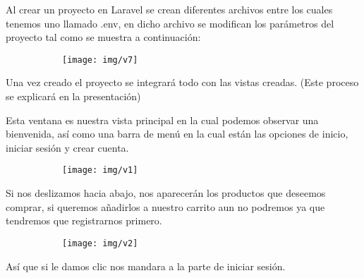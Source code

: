 \documentclass[letterpaper,12pt]{article}
\begin{document}
	
	Al crear un proyecto en Laravel se crean diferentes archivos entre los cuales tenemos uno llamado .env, en dicho archivo se modifican los parámetros del proyecto tal como se muestra a continuación:
	
	\begin{figure}[H]

		\begin{subfigure}{20cm}

			\centering

			\texttt{[image: img/v7]}

		\end{subfigure}

	\end{figure}

	Una vez creado el proyecto se integrará todo con las vistas creadas. (Este proceso se explicará en la presentación)
	
	Esta ventana es nuestra vista principal en la cual podemos observar una bienvenida, así como una barra de menú en la cual están las opciones de inicio, iniciar sesión y crear cuenta.
	
	\begin{figure}[H]

		\begin{subfigure}{20cm}

			\centering

			\texttt{[image: img/v1]}

		\end{subfigure}

	\end{figure}

	Si nos deslizamos hacia abajo, nos aparecerán los productos que deseemos comprar, si queremos añadirlos a nuestro carrito aun no podremos ya que tendremos que registrarnos primero.
	
	\begin{figure}[H]

		\begin{subfigure}{20cm}

			\centering

			\texttt{[image: img/v2]}

		\end{subfigure}

	\end{figure}

	Así que si le damos clic nos mandara a la parte de iniciar sesión.
	
\end{document}
